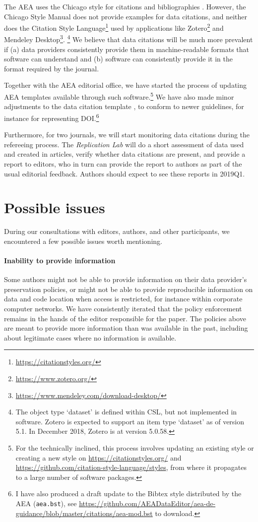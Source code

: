 \documentclass[AEJ]{AEA}
\newcommand{\urlcite}[2]{#2\footnote{\url{#1}}}
\begin{document}
The AEA uses the Chicago style for citations and bibliographies \citep{aeadatarefs}. However, the Chicago Style Manual \citep{citation-machine,ChicagoManualofStyleChicagoManualStyle2018} does not provide examples for data citations, and neither does the \urlcite{https://citationstyles.org/}{Citation Style Language} used by applications like \urlcite{https://www.zotero.org/}{Zotero} and \urlcite{https://www.mendeley.com/download-desktop/}{Mendeley Desktop}.%
\footnote{The object type `dataset' is defined within CSL, but not implemented in software. Zotero is expected to support an item type `dataset' as of version 5.1. In December 2018, Zotero is at version 5.0.58.}
We believe that data citations will be much more prevalent if (a) data providers consistently provide them in machine-readable formats that software can understand and (b) software can consistently provide it in the format required by the journal.

Together with the  AEA editorial office, we have   started the process of updating AEA templates available through such software.\footnote{For the technically inclined, this process involves updating an existing style or creating a new style on \url{https://citationstyles.org/} and \url{https://github.com/citation-style-language/styles}, from where it propagates to a large number of software packages.} We have also made minor adjustments to the data citation template \citep{aeadatarefs}, to conform to newer guidelines, for instance for representing \ac{DOI}.\footnote{I have also produced a draft update to the Bibtex style distributed by the AEA (\texttt{aea.bst}), see  \url{https://github.com/AEADataEditor/aea-de-guidance/blob/master/citations/aea-mod.bst} to download.}

Furthermore, for two journals, we will start monitoring data citations during the refereeing process. The \textit{Replication Lab} will do a short assessment of data used and created in articles, verify whether data citations are present, and provide a report to editors, who in turn can provide the report to authors as part of the usual editorial feedback. Authors should expect to see these reports in 2019Q1.

\section{Possible issues}
During our consultations with editors, authors, and other participants, we encountered a few possible issues worth mentioning.

\paragraph{Inability to provide information} Some authors might not be able to provide information on their data provider's preservation policies, or might not be able to provide reproducible information on data and code location when access is restricted, for instance within corporate computer networks. We have consistently iterated that the policy enforcement remains in the hands of the editor responsible for the paper. The policies above are meant to provide more information than was available in the past, including about legitimate cases where no information is available.
\end{document}
